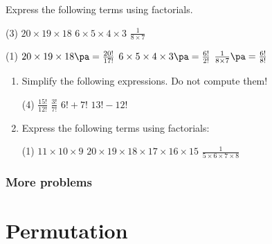 \begin{frame}[t]
\begin{ex}
Express the following terms using factorials.
\begin{tasks}(3)
\task $20 \times 19 \times 18$
\task $6 \times 5 \times 4 \times 3$
\task $\frac{1}{8 \times 7}$
\end{tasks}
\end{ex} \pa
\begin{sol}
\begin{tasks}(1)
\task $20 \times 19 \times 18 \pa =\frac{20!}{17!}$
\task $6 \times 5 \times 4 \times 3 \pa = \frac{6!}{2!}$
\task $\frac{1}{8 \times 7} \pa = \frac{6!}{8!}$
\end{tasks}
\end{sol}
\end{frame}

\begin{frame}
\begin{exercisebox}{}{}
\begin{enumerate}
\item Simplify the following expressions. Do not compute them!
\begin{tasks}(4)
\task $\frac{15!}{12!}$
\task $\frac{3!}{7!}$
\task $6! + 7!$
\task $13! - 12!$
\end{tasks}
\item Express the following terms using factorials:
\begin{tasks}(1)
\task $11 \times 10 \times 9$
\task $20 \times 19 \times 18 \times 17 \times 16 \times 15$
\task $\frac{1}{5 \times 6 \times 7 \times 8}$
\end{tasks}
\end{enumerate}
\end{exercisebox}
\end{frame}

\begin{frame}
\frametitle{More problems}
\end{frame}


\section{Permutation}
\frame{\sectionpage}

